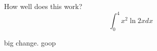 \documentclass{article}
\begin{document}
How well does this work?
$$\int_0^4 x^2 \ln{2x}dx$$

big change. goop
\end{document}

